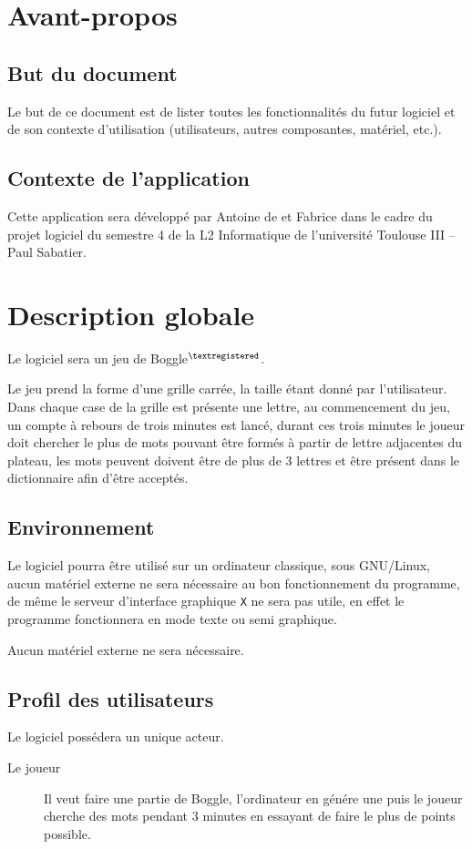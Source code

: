 \documentclass[12pt,a4paper,openany]{article}
\begin{document}
	\setcounter{tocdepth}{2}
	\setcounter{secnumdepth}{3}
	\maketitle
	\tableofcontents
	\newpage
	\section{Avant-propos}
		\subsection{But du document}
	Le but de ce document est de lister toutes les fonctionnalités du futur logiciel et de son contexte d’utilisation (utilisateurs, autres composantes,
	matériel,  etc.).
		\subsection{Contexte de l'application}
		Cette application sera développé par Antoine de  et Fabrice  dans le cadre du projet logiciel du 
		semestre 4 de la L2 Informatique de l'université Toulouse III -- Paul Sabatier.

	
	\section{Description globale} 
	Le logiciel sera un jeu de Boggle$^{\tiny\textregistered}$.

	Le jeu prend la forme d'une grille carrée, la taille étant donné par l'utilisateur. Dans chaque case de la grille est présente une lettre, au
	commencement du jeu, un compte à rebours de trois minutes est lancé, durant ces trois minutes le joueur doit chercher le plus de mots pouvant être
	formés à partir de lettre adjacentes du plateau, les mots peuvent doivent être de plus de 3 lettres et être présent dans le dictionnaire afin d'être
	acceptés.
	\subsection{Environnement}
		Le logiciel pourra être utilisé sur un ordinateur classique, sous GNU/Linux, aucun matériel externe ne sera nécessaire au bon fonctionnement du
		programme, de même le serveur d'interface graphique \texttt{X} ne sera pas utile, en effet le programme fonctionnera en mode texte ou semi graphique.

		Aucun matériel externe ne sera nécessaire.
	\subsection{Profil des utilisateurs}
		Le logiciel possédera un unique acteur.
		\begin{description}
			\item[Le joueur] Il veut faire une partie de Boggle, l'ordinateur en génére une puis le joueur cherche des mots pendant 3 minutes en
				essayant de faire le plus de points possible.
		\end{description}
\end{document}
